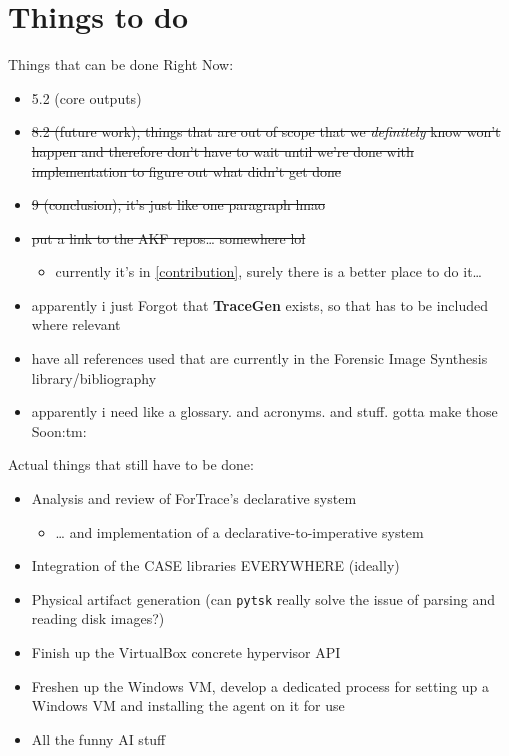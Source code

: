 \section{Things to do}\label{things-to-do}

Things that can be done Right Now:

\begin{itemize}
\tightlist
\item
  5.2 (core outputs)
\item
  \st{8.2 (future work), things that are out of scope that we
  \emph{definitely} know won't happen and therefore don't have to wait
  until we're done with implementation to figure out what didn't get
  done}
\item
  \st{9 (conclusion), it's just like one paragraph lmao}
\item
  \st{put a link to the AKF repos\ldots{} somewhere lol}

  \begin{itemize}
  \tightlist
  \item
    currently it's in \autoref{contribution},
    surely there is a better place to do it\ldots{}
  \end{itemize}
\item
  apparently i just Forgot that \textbf{TraceGen} exists, so that has to
  be included where relevant
\item
  have all references used that are currently in the Forensic Image
  Synthesis library/bibliography
\item
  apparently i need like a glossary. and acronyms. and stuff. gotta make
  those Soon:tm:
\end{itemize}

Actual things that still have to be done:

\begin{itemize}
\tightlist
\item
  Analysis and review of ForTrace's declarative system

  \begin{itemize}
  \tightlist
  \item
    \ldots{} and implementation of a declarative-to-imperative system
  \end{itemize}
\item
  Integration of the CASE libraries EVERYWHERE (ideally)
\item
  Physical artifact generation (can \passthrough{\lstinline!pytsk!}
  really solve the issue of parsing and reading disk images?)
\item
  Finish up the VirtualBox concrete hypervisor API
\item
  Freshen up the Windows VM, develop a dedicated process for setting up
  a Windows VM and installing the agent on it for use
\item
  All the funny AI stuff
\end{itemize}

